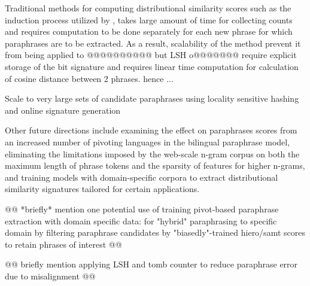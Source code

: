 \documentclass[11pt]{article}
\begin{document}

Traditional methods for computing distributional similarity scores such as the induction process utilized by , takes large amount of time for collecting counts and requires computation to be done separately for each new phrase for which paraphrases are to be extracted. As a result, scalability of the method prevent it from being applied to @@@@@@@@@@ but LSH o@@@@@@@ require explicit storage of the bit signature and requires linear time computation for calculation of cosine distance between 2 phrases. hence ...
\item Scale to very large sets of candidate paraphrases using locality sensitive hashing and online signature generation \cite{Charikar02,VanDurmeLallACL10}

Other future directions include examining the effect on paraphrases scores from an increased number of pivoting languages in the bilingual paraphrase model, eliminating the limitations imposed by the web-scale n-gram corpus on both the maximum length of phrase tokens and the sparsity of features for higher n-grams, and training models with domain-specific corpora to extract distributional similarity signatures tailored for certain applications.




@@ *briefly* mention one potential use of training pivot-based paraphrase extraction with domain specific data: for "hybrid" paraphrasing to specific domain by filtering paraphrase candidates by "biasedly"-trained hiero/samt scores to retain phrases of interest @@

@@ briefly mention applying LSH and tomb counter to reduce paraphrase error due to misalignment @@
\end{document}
